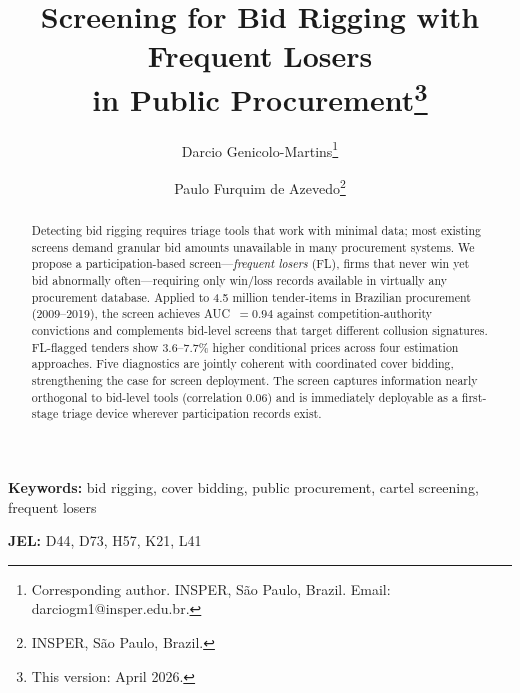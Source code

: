 \title{Screening for Bid Rigging with Frequent Losers\\in Public Procurement\thanks{This version: April 2026.}}

\author{Darcio Genicolo-Martins\thanks{Corresponding author. INSPER, S\~ao Paulo, Brazil. Email: darciogm1@insper.edu.br.} \and Paulo Furquim de Azevedo\thanks{INSPER, S\~ao Paulo, Brazil.}}

\date{}

\maketitle

\begin{abstract}
\noindent
Detecting bid rigging requires triage tools that work with minimal
data; most existing screens demand granular bid amounts unavailable
in many procurement systems. We propose a participation-based
screen---\emph{frequent losers} (FL), firms that never win yet bid
abnormally often---requiring only win/loss records available in
virtually any procurement database. Applied to 4.5 million
tender-items in Brazilian procurement (2009--2019), the screen
achieves AUC~$= 0.94$ against competition-authority convictions
and complements bid-level screens that target different collusion
signatures. FL-flagged tenders show 3.6--7.7\% higher conditional
prices across four estimation approaches. Five diagnostics are
jointly coherent with coordinated cover bidding, strengthening the
case for screen deployment. The screen captures information nearly
orthogonal to bid-level tools (correlation 0.06) and is immediately
deployable as a first-stage triage device wherever participation
records exist.
\end{abstract}

\noindent\textbf{Keywords:} bid rigging, cover bidding, public procurement, cartel screening, frequent losers

\noindent\textbf{JEL:} D44, D73, H57, K21, L41

\bigskip
